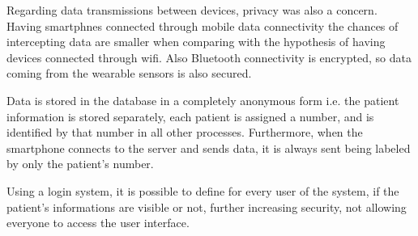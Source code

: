 Regarding data transmissions between devices, privacy was also a concern. Having smartphnes connected through mobile data connectivity the chances of intercepting data are smaller when comparing with the hypothesis of having devices connected through wifi. Also Bluetooth connectivity is encrypted, so data coming from the wearable sensors is also secured.

Data is stored in the database in a completely anonymous form i.e. the patient information is stored separately, each patient is assigned a number, and is identified by that number in all other processes. Furthermore, when the smartphone connects to the server and sends data, it is always sent being labeled by only the patient's number.

Using a login system, it is possible to define for every user of the system, if the patient's informations are visible or not, further increasing security, not allowing everyone to access the user interface.